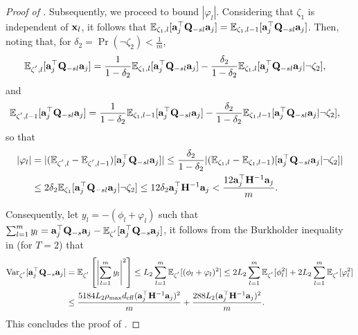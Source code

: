 \documentclass[11pt,a4paper]{article}
\begin{document}
\begin{proof}[Proof of ]
Subsequently, we proceed to bound  $|\varphi_l|$. 
Considering that $\zeta_1$ is independent of $\mathbf{x}_{l}$, it follows that ${\mathbb{E}}_{\zeta_1,l}[\mathbf{a}_j^\top\mathbf{Q}_{-sl}\mathbf{a}_j]={\mathbb{E}}_{\zeta_1,l-1}[\mathbf{a}_j^\top\mathbf{Q}_{-sl}\mathbf{a}_j]$. 
Then, noting that, for $\delta_2=\Pr(\neg\zeta_2)<\frac{1}{m}$,
\begin{align}
    {\mathbb{E}}_{\zeta^{'},l}[\mathbf{a}_j^\top\mathbf{Q}_{-sl}\mathbf{a}_j]&=\frac{1}{1-\delta_2}   {\mathbb{E}}_{\zeta_1,l}[\mathbf{a}_j^\top\mathbf{Q}_{-sl}\mathbf{a}_j]
   -\frac{\delta_2}{1-\delta_2}{\mathbb{E}}_{\zeta_1,l}[\mathbf{a}_j^\top\mathbf{Q}_{-sl}\mathbf{a}_j|\neg\zeta_2], \nonumber 
\end{align}
and
\begin{align}
   {\mathbb{E}}_{\zeta^{'},l-1}[\mathbf{a}_j^\top\mathbf{Q}_{-sl}\mathbf{a}_j]
    &  =\frac{1}{1-\delta_2}   {\mathbb{E}}_{\zeta_1,l-1}[\mathbf{a}_j^\top\mathbf{Q}_{-sl}\mathbf{a}_j]
   -\frac{\delta_2}{1-\delta_2}{\mathbb{E}}_{\zeta_1,l-1}[\mathbf{a}_j^\top\mathbf{Q}_{-sl}\mathbf{a}_j|\neg\zeta_2], \nonumber 
\end{align}
so that
\begin{align}
    |\varphi_l|&=|({\mathbb{E}}_{\zeta^{'},l}-{\mathbb{E}}_{\zeta^{'},l-1})[\mathbf{a}_j^\top\mathbf{Q}_{-sl}\mathbf{a}_j]
    |\leq \frac{\delta_2}{1-\delta_2}|({\mathbb{E}}_{\zeta_1,l}-{\mathbb{E}}_{\zeta_1,l-1})[\mathbf{a}_j^\top\mathbf{Q}_{-sl}\mathbf{a}_j |\neg\zeta_2]
 | \nonumber\\
    &\leq 2\delta_2
    {\mathbb{E}}_{\zeta_1}[\mathbf{a}_j^\top\mathbf{Q}_{-sl}\mathbf{a}_j|\neg\zeta_2]\leq 12\delta_2\mathbf{a}_j^\top\mathbf{H}^{-1}\mathbf{a}_j<\frac{12\mathbf{a}_j^\top\mathbf{H}^{-1}\mathbf{a}_j}{m}.
    \nonumber  
\end{align}

Consequently, let $y_l= -(\phi_l+\varphi_l) $ such that  $\sum^m_{l=1}y_l=\mathbf{a}_j^\top\mathbf{Q}_{-s}\mathbf{a}_j-{\mathbb{E}}_{\zeta^{'}}[\mathbf{a}_j^\top\mathbf{Q}_{-s}\mathbf{a}_j] $, it follows from the Burkholder inequality in  (for $T=2$) that
\begin{align}
    \operatorname{Var}_{\zeta^{'}}[\mathbf{a}_j^\top\mathbf{Q}_{-s}\mathbf{a}_j]&={\mathbb{E}}_{\zeta^{'}}\left[ \left|\sum^m_{l=1}y_l\right|^2\right]
    \leq L_2\sum^m_{l=1}{\mathbb{E}}_{\zeta^{'}}[(\phi_l+\varphi_l )^2]\leq 2L_2 \sum^m_{l=1}{\mathbb{E}}_{\zeta^{'}}[\phi^2_l]+2L_2 \sum^m_{l=1}{\mathbb{E}}_{\zeta^{'}}[\varphi^2_l]\nonumber \\
    &\leq \frac{5184 L_2\rho_{\max}  d_{\mathrm{eff}}(\mathbf{a}_j^\top\mathbf{H}^{-1}\mathbf{a}_j)^2}{m} +\frac{288L_2(\mathbf{a}_j^\top\mathbf{H}^{-1}\mathbf{a}_j)^2}{m}.
   \nonumber
\end{align}
This concludes the proof of .
\end{proof}
\end{document}

